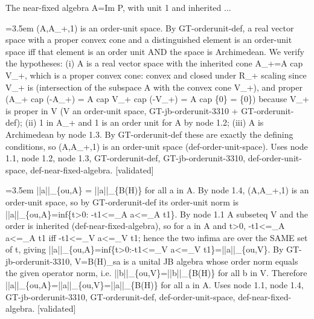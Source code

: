 \documentclass{article}
\newcommand{\step}[1]{\par\noindent\hangindent=3.5em\hangafter=1%
  \makebox[3.5em][l]{\textbf{#1.}}}
\newcommand{\steptag}[1]{\hfill{\small\textsf{[#1]}}}
\begin{document}
\begin{proofbox}{The near-fixed algebra A=Im P, with unit 1 and inherited ...}
\step{1.4} (A,A\_+,1) is an order-unit space. By GT-orderunit-def, a real vector space with a proper convex cone and a distinguished element is an order-unit space iff that element is an order unit AND the space is Archimedean. We verify the hypotheses: (i) A is a real vector space with the inherited cone A\_+=A cap V\_+, which is a proper convex cone: convex and closed under R\_+ scaling since V\_+ is (intersection of the subspace A with the convex cone V\_+), and proper (A\_+ cap (-A\_+) = A cap V\_+ cap (-V\_+) = A cap \{0\} = \{0\}) because V\_+ is proper in V (V an order-unit space, GT-jb-orderunit-3310 + GT-orderunit-def); (ii) 1 in A\_+ and 1 is an order unit for A by node 1.2; (iii) A is Archimedean by node 1.3. By GT-orderunit-def these are exactly the defining conditions, so (A,A\_+,1) is an order-unit space (def-order-unit-space). Uses node 1.1, node 1.2, node 1.3, GT-orderunit-def, GT-jb-orderunit-3310, def-order-unit-space, def-near-fixed-algebra. \steptag{validated} \\[4pt]
\step{1.5} ||a||\_\{ou,A\} = ||a||\_\{B(H)\} for all a in A. By node 1.4, (A,A\_+,1) is an order-unit space, so by GT-orderunit-def its order-unit norm is ||a||\_\{ou,A\}=inf\{t>0: -t1<=\_A a<=\_A t1\}. By node 1.1 A subseteq V and the order is inherited (def-near-fixed-algebra), so for a in A and t>0, -t1<=\_A a<=\_A t1 iff -t1<=\_V a<=\_V t1; hence the two infima are over the SAME set of t, giving ||a||\_\{ou,A\}=inf\{t>0:-t1<=\_V a<=\_V t1\}=||a||\_\{ou,V\}. By GT-jb-orderunit-3310, V=B(H)\_sa is a unital JB algebra whose order norm equals the given operator norm, i.e. ||b||\_\{ou,V\}=||b||\_\{B(H)\} for all b in V. Therefore ||a||\_\{ou,A\}=||a||\_\{ou,V\}=||a||\_\{B(H)\} for all a in A. Uses node 1.1, node 1.4, GT-jb-orderunit-3310, GT-orderunit-def, def-order-unit-space, def-near-fixed-algebra. \steptag{validated} \\[4pt]
\end{proofbox}
\end{document}

